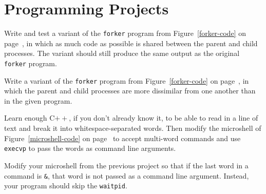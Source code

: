 \section*{Programming Projects}
\begin{chapterEnumerate}
\item\label{refactored-processes-project}
Write and test a variant of the {\tt forker} program from Figure~\ref{forker-code}
on page~\pageref{forker-code},
in which as much code as possible is shared between the parent and
child processes. The variant should still produce the same output as the original 
{\tt forker} program.
\item\label{dissimilar-processes-project}
Write a variant of the {\tt forker} program from Figure~\ref{forker-code} on
page~\pageref{forker-code},
in which
the parent and child processes are more dissimilar
from one another than in the given program.
\item\label{shell-project-1}
Learn enough C$++$, if you don't already know it, to be able to read
in a line of text and break it into whitespace-separated words.  Then
modify the microshell of Figure~\ref{microshell-code} on
page~\pageref{microshell-code} to accept multi-word commands and use
\verb|execvp| to pass the words as command line arguments.
\item\label{shell-project-2}
Modify your microshell from the previous project so that if the last
word in a command is \verb|&|, that word is not passed as a command
line argument.  Instead, your program should skip the \verb|waitpid|.


\end{chapterEnumerate}
